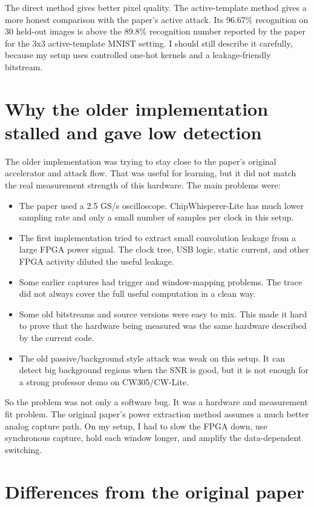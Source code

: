 \documentclass[11pt]{article}
\begin{document}
The direct method gives better pixel quality. The active-template method gives a
more honest comparison with the paper's active attack. Its 96.67\% recognition
on 30 held-out images is above the 89.8\% recognition number reported by the
paper for the 3x3 active-template MNIST setting. I should still describe it
carefully, because my setup uses controlled one-hot kernels and a leakage-friendly
bitstream.

\section*{Why the older implementation stalled and gave low detection}

The older implementation was trying to stay close to the paper's original
accelerator and attack flow. That was useful for learning, but it did not match
the real measurement strength of this hardware. The main problems were:

\begin{itemize}
  \item The paper used a 2.5 GS/s oscilloscope. ChipWhisperer-Lite has much lower
  sampling rate and only a small number of samples per clock in this setup.
  \item The first implementation tried to extract small convolution leakage from
  a large FPGA power signal. The clock tree, USB logic, static current, and other
  FPGA activity diluted the useful leakage.
  \item Some earlier captures had trigger and window-mapping problems. The trace
  did not always cover the full useful computation in a clean way.
  \item Some old bitstreams and source versions were easy to mix. This made it
  hard to prove that the hardware being measured was the same hardware described
  by the current code.
  \item The old passive/background style attack was weak on this setup. It can
  detect big background regions when the SNR is good, but it is not enough for a
  strong professor demo on CW305/CW-Lite.
\end{itemize}

So the problem was not only a software bug. It was a hardware and measurement
fit problem. The original paper's power extraction method assumes a much better
analog capture path. On my setup, I had to slow the FPGA down, use synchronous
capture, hold each window longer, and amplify the data-dependent switching.

\section*{Differences from the original paper}
\end{document}
